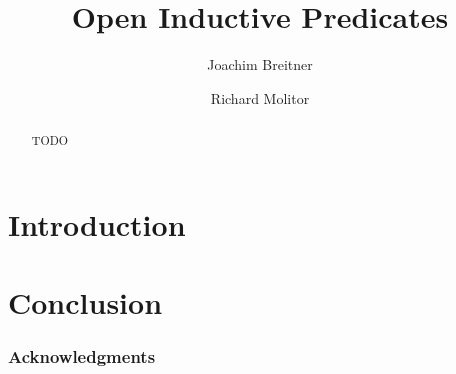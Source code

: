 \documentclass{llncs}
\title{Open Inductive Predicates}
\author{Joachim Breitner \and Richard Molitor}
\institute{Karlsruhe Institute of Technology}
\begin{document}
\maketitle

\begin{abstract}
TODO
\end{abstract}

\section{Introduction}

\section{Conclusion}

\subsubsection*{Acknowledgments}



\end{document}
